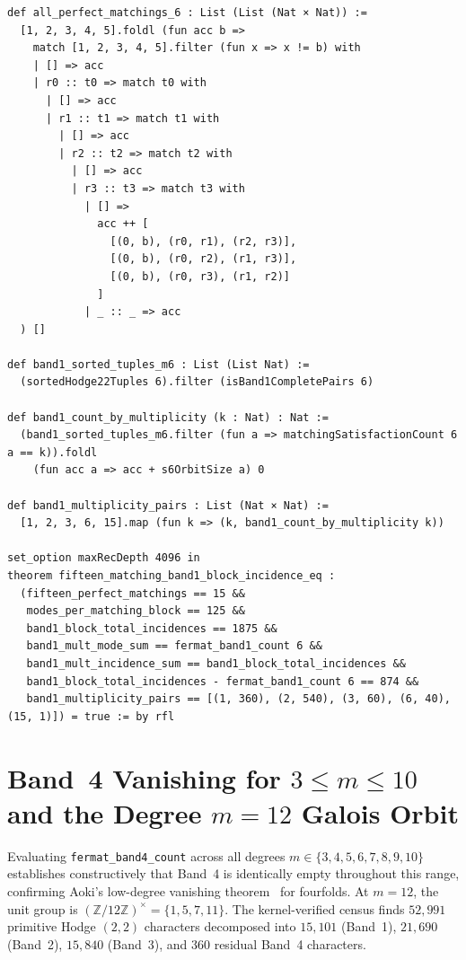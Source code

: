 \documentclass[11pt,a4paper]{article}
\begin{document}
\begin{lstlisting}[caption={Algorithmic $15$-matching multiplicity theorem in \texttt{HodgeVerification.lean}.}]
def all_perfect_matchings_6 : List (List (Nat × Nat)) :=
  [1, 2, 3, 4, 5].foldl (fun acc b =>
    match [1, 2, 3, 4, 5].filter (fun x => x != b) with
    | [] => acc
    | r0 :: t0 => match t0 with
      | [] => acc
      | r1 :: t1 => match t1 with
        | [] => acc
        | r2 :: t2 => match t2 with
          | [] => acc
          | r3 :: t3 => match t3 with
            | [] =>
              acc ++ [
                [(0, b), (r0, r1), (r2, r3)],
                [(0, b), (r0, r2), (r1, r3)],
                [(0, b), (r0, r3), (r1, r2)]
              ]
            | _ :: _ => acc
  ) []

def band1_sorted_tuples_m6 : List (List Nat) :=
  (sortedHodge22Tuples 6).filter (isBand1CompletePairs 6)

def band1_count_by_multiplicity (k : Nat) : Nat :=
  (band1_sorted_tuples_m6.filter (fun a => matchingSatisfactionCount 6 a == k)).foldl
    (fun acc a => acc + s6OrbitSize a) 0

def band1_multiplicity_pairs : List (Nat × Nat) :=
  [1, 2, 3, 6, 15].map (fun k => (k, band1_count_by_multiplicity k))

set_option maxRecDepth 4096 in
theorem fifteen_matching_band1_block_incidence_eq :
  (fifteen_perfect_matchings == 15 &&
   modes_per_matching_block == 125 &&
   band1_block_total_incidences == 1875 &&
   band1_mult_mode_sum == fermat_band1_count 6 &&
   band1_mult_incidence_sum == band1_block_total_incidences &&
   band1_block_total_incidences - fermat_band1_count 6 == 874 &&
   band1_multiplicity_pairs == [(1, 360), (2, 540), (3, 60), (6, 40), (15, 1)]) = true := by rfl
\end{lstlisting}

\section{Band~4 Vanishing for \texorpdfstring{$3 \le m \le 10$}{3 <= m <= 10} and the Degree \texorpdfstring{$m = 12$}{m = 12} Galois Orbit}

Evaluating \texttt{fermat\_band4\_count} across all degrees $m \in \{3, 4, 5, 6, 7, 8, 9, 10\}$ establishes constructively that Band~4 is identically empty throughout this range, confirming Aoki's low-degree vanishing theorem~\cite{Aoki1983} for fourfolds. At $m = 12$, the unit group is $(\mathbb{Z}/12\mathbb{Z})^\times = \{1, 5, 7, 11\}$. The kernel-verified census finds $52{,}991$ primitive Hodge $(2,2)$ characters decomposed into $15{,}101$ (Band~1), $21{,}690$ (Band~2), $15{,}840$ (Band~3), and $360$ residual Band~4 characters.
\end{document}
